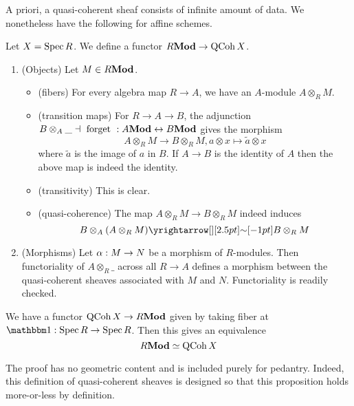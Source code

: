 \documentclass[./main.tex]{subfiles}
\begin{document}
A priori, a quasi-coherent sheaf consists of
infinite amount of data.
We nonetheless have the following for affine schemes.

\begin{prop}
  
  Let $X = \operatorname{Spec} R$.
  We define a functor $R\mathbf{Mod} \to \operatorname{QCoh} X$.
  \begin{enumerate}
    \item (Objects) Let $M \in R\mathbf{Mod}$.
    \begin{itemize}
      \item (fibers) 
      For every algebra map $R \to A$,
      we have an $A$-module $A \otimes_R M$.
      \item (transition maps) For $R \to A \to B$,
      the adjunction $B \otimes_A \_ \dashv \text{ forget } : 
      A\mathbf{Mod} \leftrightarrow B\mathbf{Mod}$ gives the morphism
      \[
        A \otimes_R M \to B\otimes_R M ,
        a \otimes x \mapsto \tilde{a} \otimes x
      \]
      where $\tilde{a}$ is the image of $a$ in $B$.
      If $A \to B$ is the identity of $A$
      then the above map is indeed the identity.
      \item (transitivity) This is clear.
      \item (quasi-coherence)
      The map $A \otimes_R M \to B\otimes_R M$
      indeed induces
      \[
        B \otimes_A (A \otimes_R M) \map{\sim}{} B\otimes_R M
      \]
    \end{itemize}
    \item (Morphisms) Let $\alpha : M \to N$ be a morphism
    of $R$-modules.
    Then functoriality of $A \otimes_R \_$
    across all $R \to A$ defines
    a morphism between the quasi-coherent sheaves associated with
    $M$ and $N$.
    Functoriality is readily checked.
  \end{enumerate}
  We have a functor $\operatorname{QCoh} X \to R\mathbf{Mod}$ given by
  taking fiber at $\id : \SPEC R \to \SPEC R$.
  Then this gives an equivalence \[
    R\mathbf{Mod} \simeq \operatorname{QCoh} X  
  \]
\end{prop}
The proof has no geometric content and is included
purely for pedantry.
Indeed, this definition of quasi-coherent sheaves
is designed so that this proposition holds more-or-less by definition.
\end{document}

